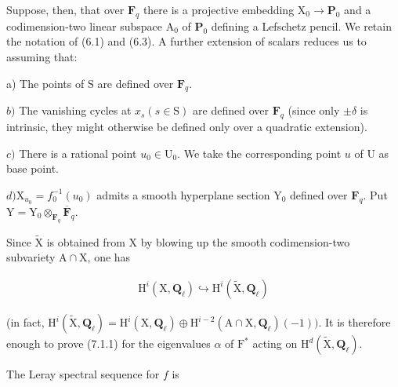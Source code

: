\documentclass[10pt,leqno]{article}
\begin{document}
\noindent Suppose, then, that over \(\mathbf{F}_{q}\) there is a projective embedding \(\mathrm{X}_{0}\longrightarrow \mathbf{P}_{0}\) and a codimension-two linear subspace \(\mathrm{A}_{0}\) of \(\mathbf{P}_{0}\) defining a Lefschetz pencil. We retain the notation of (6.1) and (6.3). A further extension of scalars reduces us to assuming that:\par

\noindent a) The points of \(\mathrm{S}\) are defined over \(\mathbf{F}_{q}\).\par

\noindent \(b)\) The vanishing cycles at \(x_{s} (s\in \mathrm{S})\) are defined over \(\mathbf{F}_{q}\) (since only \(\pm \delta \) is intrinsic, they might otherwise be defined only over a quadratic extension).\par

\noindent \(c)\) There is a rational point \(u_{0}\in \mathrm{U}_{0}\). We take the corresponding point \(u\) of \(\mathrm{U}\) as base point.\par

\noindent \(d) \mathrm{X}_{u_{0}}=f_{0}^{- 1}(u_{0})\) admits a smooth hyperplane section \(\mathrm{Y}_{0}\) defined over \(\mathbf{F}_{q}\). Put \(\mathrm{Y}=\mathrm{Y}_{0}\otimes _{\mathbf{F}_{q}}\overline{\mathbf{F}}_{q}\).\par

\noindent Since \(\widetilde{\mathrm{X}}\) is obtained from \(\mathrm{X}\) by blowing up the smooth codimension-two subvariety \(\mathrm{A}\cap \mathrm{X}\), one has\par

\begin{equation*}\begin{gathered}\mathrm{H}^{i}(\mathrm{X},\mathbf{Q}_{\ell }) \hookrightarrow  \mathrm{H}^{i}(\widetilde{\mathrm{X}},\mathbf{Q}_{\ell })\end{gathered}\end{equation*}

\noindent (in fact, \(\mathrm{H}^{i}(\widetilde{\mathrm{X}},\mathbf{Q}_{\ell })=\mathrm{H}^{i}(\mathrm{X},\mathbf{Q}_{\ell })\oplus \mathrm{H}^{i- 2}(\mathrm{A}\cap \mathrm{X},\mathbf{Q}_{\ell })(- 1))\). It is therefore enough to prove (7.1.1) for the eigenvalues \(\alpha \) of \(\mathrm{F}^{*}\) acting on \(\mathrm{H}^{d}(\widetilde{\mathrm{X}},\mathbf{Q}_{\ell })\).\par

\noindent The Leray spectral sequence for \(f\) is\par
\end{document}
